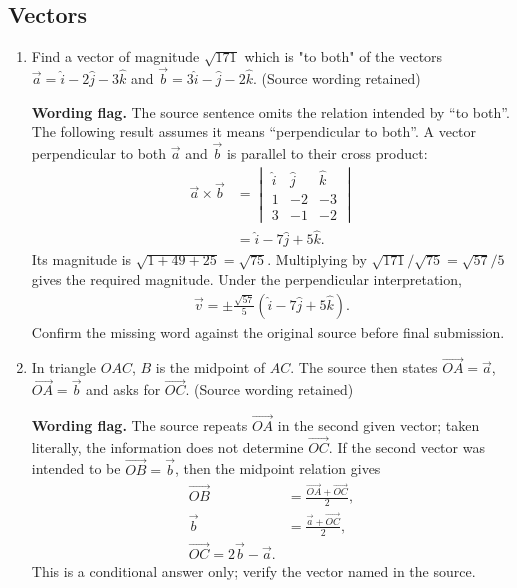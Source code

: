 \subsection{Vectors}
\begin{enumerate}[label=\thesubsection.\arabic*,ref=\thesubsection.\theenumi]

\item Find a vector of magnitude $\sqrt{171}$ which is "to both" of the vectors $\vec a=\hat i-2\hat j-3\hat k$ and $\vec b=3\hat i-\hat j-2\hat k$. \hfill (Source wording retained)

\solution
\textbf{Wording flag.} The source sentence omits the relation intended by “to both”. The following result assumes it means “perpendicular to both”. A vector perpendicular to both $\vec a$ and $\vec b$ is parallel to their cross product:
\begin{align}
 \vec a\times\vec b
 &=\begin{vmatrix}\hat i&\hat j&\hat k\\1&-2&-3\\3&-1&-2\end{vmatrix}\\
 &=\hat i-7\hat j+5\hat k.
\end{align}
Its magnitude is $\sqrt{1+49+25}=\sqrt{75}$. Multiplying by $\sqrt{171}/\sqrt{75}=\sqrt{57}/5$ gives the required magnitude. Under the perpendicular interpretation,
\begin{align}
 \boxed{\vec v=\pm\frac{\sqrt{57}}{5}\left(\hat i-7\hat j+5\hat k\right)}.
\end{align}
Confirm the missing word against the original source before final submission.

\item In triangle $OAC$, $B$ is the midpoint of $AC$. The source then states $\overrightarrow{OA}=\vec a$, $\overrightarrow{OA}=\vec b$ and asks for $\overrightarrow{OC}$. \hfill (Source wording retained)

\solution
\textbf{Wording flag.} The source repeats $\overrightarrow{OA}$ in the second given vector; taken literally, the information does not determine $\overrightarrow{OC}$. If the second vector was intended to be $\overrightarrow{OB}=\vec b$, then the midpoint relation gives
\begin{align}
 \overrightarrow{OB}&=\frac{\overrightarrow{OA}+\overrightarrow{OC}}{2},\\
 \vec b&=\frac{\vec a+\overrightarrow{OC}}{2},\\
 \boxed{\overrightarrow{OC}=2\vec b-\vec a}.
\end{align}
This is a conditional answer only; verify the vector named in the source.


\end{enumerate}
